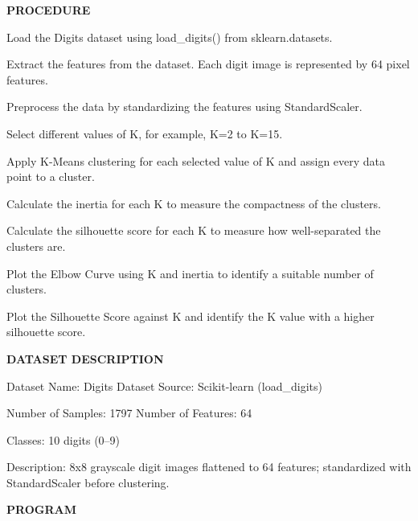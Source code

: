 \documentclass[11pt,twoside]{article}
\newcommand{\expheading}[1]{{\fontsize{14}{17}\selectfont\textbf{#1}\par}}
\newcommand{\toevenpage}{\clearpage\ifodd\value{page}\null\thispagestyle{empty}\newpage\fi}
\begin{document}
{\expheading{PROCEDURE}
\vspace{4pt}
\noindent Load the Digits dataset using load\_digits() from sklearn.datasets.\par
\noindent Extract the features from the dataset. Each digit image is represented by 64 pixel features.\par
\noindent Preprocess the data by standardizing the features using StandardScaler.\par
\noindent Select different values of K, for example, K=2 to K=15.\par
\noindent Apply K-Means clustering for each selected value of K and assign every data point to a cluster.\par
\noindent Calculate the inertia for each K to measure the compactness of the clusters.\par
\noindent Calculate the silhouette score for each K to measure how well-separated the clusters are.\par
\noindent Plot the Elbow Curve using K and inertia to identify a suitable number of clusters.\par
\noindent Plot the Silhouette Score against K and identify the K value with a higher silhouette score. \par
\vspace{4pt}

\expheading{DATASET DESCRIPTION}
\vspace{4pt}
\noindent Dataset Name: Digits Dataset \hspace{0.3cm} Source: Scikit-learn (load\_digits)\par
\noindent Number of Samples: 1797 \hspace{0.3cm} Number of Features: 64\par
\noindent Classes: 10 digits (0--9)\par
\noindent Description: 8x8 grayscale digit images flattened to 64 features; standardized with StandardScaler before clustering. \par
\vspace{4pt}
} %
\toevenpage
\expheading{PROGRAM}
\vspace{6pt}
\end{document}
